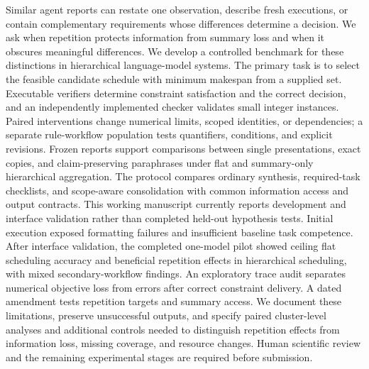 Similar agent reports can restate one observation, describe fresh executions,
or contain complementary requirements whose differences determine a decision.
We ask when repetition protects information from summary loss and when it obscures
meaningful differences. We develop a controlled benchmark for these distinctions in hierarchical
language-model systems. The primary task is to select the feasible candidate
schedule with minimum makespan from a supplied set. Executable verifiers determine
constraint satisfaction and the correct decision, and an independently implemented
checker validates small integer instances. Paired interventions change numerical
limits, scoped identities, or dependencies; a separate rule-workflow population
tests quantifiers, conditions, and explicit revisions. Frozen reports support
comparisons between single presentations, exact copies, and claim-preserving
paraphrases under flat and summary-only hierarchical aggregation. The protocol
compares ordinary synthesis, required-task checklists, and scope-aware consolidation
with common information access and output contracts. This working manuscript
currently reports development and interface validation rather than completed
held-out hypothesis tests. Initial execution exposed formatting failures and
insufficient baseline task competence. After interface validation, the completed
one-model pilot showed ceiling flat scheduling accuracy and beneficial repetition
effects in hierarchical scheduling, with mixed secondary-workflow findings.
An exploratory trace audit separates numerical objective loss from errors after
correct constraint delivery. A dated amendment tests repetition targets and summary access.
We document these limitations, preserve unsuccessful outputs, and
specify paired cluster-level analyses and additional controls needed to distinguish
repetition effects from information loss, missing coverage, and resource changes.
Human scientific review and the remaining experimental stages are required before
submission.
